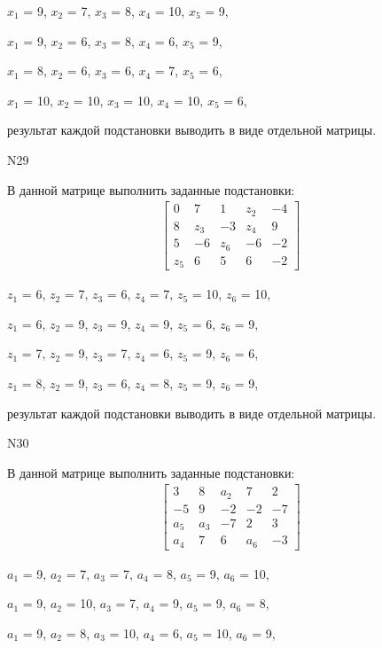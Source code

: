 \documentclass[11pt]{report}
\begin{document}
$x_{1}$ = 9, $x_{2}$ = 7, $x_{3}$ = 8, $x_{4}$ = 10, $x_{5}$ = 9, 

$x_{1}$ = 9, $x_{2}$ = 6, $x_{3}$ = 8, $x_{4}$ = 6, $x_{5}$ = 9, 

$x_{1}$ = 8, $x_{2}$ = 6, $x_{3}$ = 6, $x_{4}$ = 7, $x_{5}$ = 6, 

$x_{1}$ = 10, $x_{2}$ = 10, $x_{3}$ = 10, $x_{4}$ = 10, $x_{5}$ = 6, 

результат каждой подстановки выводить в виде отдельной матрицы.

N29

В данной матрице выполнить заданные подстановки:
\begin{align*}
\left[\begin{matrix}0 & 7 & 1 & z_{2} & -4\\8 & z_{3} & -3 & z_{4} & 9\\5 & -6 & z_{6} & -6 & -2\\z_{5} & 6 & 5 & 6 & -2\end{matrix}\right]
\end{align*}


$z_{1}$ = 6, $z_{2}$ = 7, $z_{3}$ = 6, $z_{4}$ = 7, $z_{5}$ = 10, $z_{6}$ = 10, 

$z_{1}$ = 6, $z_{2}$ = 9, $z_{3}$ = 9, $z_{4}$ = 9, $z_{5}$ = 6, $z_{6}$ = 9, 

$z_{1}$ = 7, $z_{2}$ = 9, $z_{3}$ = 7, $z_{4}$ = 6, $z_{5}$ = 9, $z_{6}$ = 6, 

$z_{1}$ = 8, $z_{2}$ = 9, $z_{3}$ = 6, $z_{4}$ = 8, $z_{5}$ = 9, $z_{6}$ = 9, 

результат каждой подстановки выводить в виде отдельной матрицы.

N30

В данной матрице выполнить заданные подстановки:
\begin{align*}
\left[\begin{matrix}3 & 8 & a_{2} & 7 & 2\\-5 & 9 & -2 & -2 & -7\\a_{5} & a_{3} & -7 & 2 & 3\\a_{4} & 7 & 6 & a_{6} & -3\end{matrix}\right]
\end{align*}


$a_{1}$ = 9, $a_{2}$ = 7, $a_{3}$ = 7, $a_{4}$ = 8, $a_{5}$ = 9, $a_{6}$ = 10, 

$a_{1}$ = 9, $a_{2}$ = 10, $a_{3}$ = 7, $a_{4}$ = 9, $a_{5}$ = 9, $a_{6}$ = 8, 

$a_{1}$ = 9, $a_{2}$ = 8, $a_{3}$ = 10, $a_{4}$ = 6, $a_{5}$ = 10, $a_{6}$ = 9, 
\end{document}
